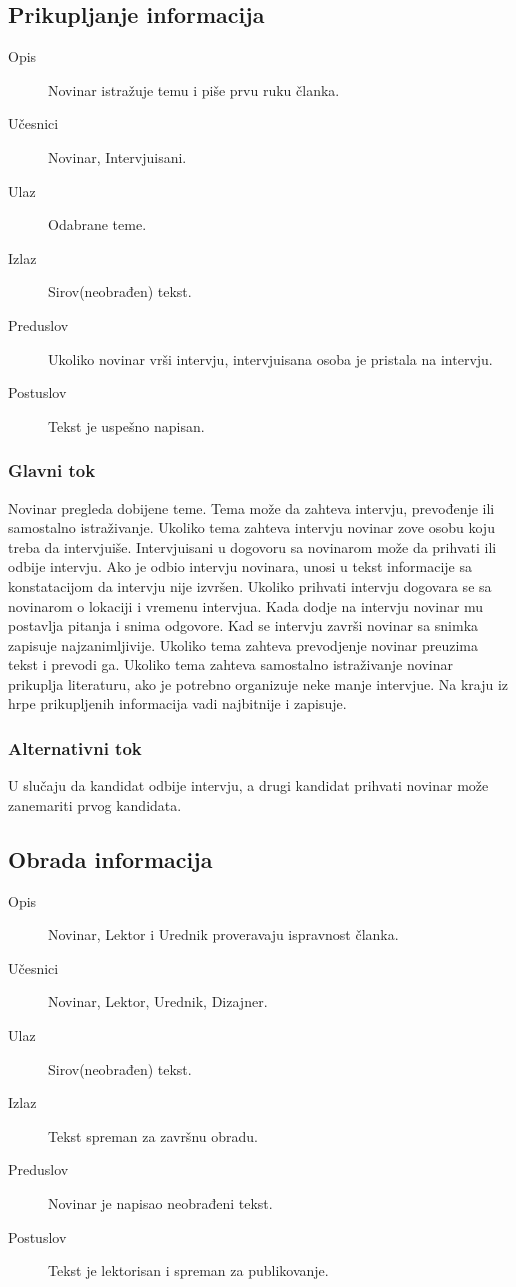 \subsection{Prikupljanje informacija}
\begin{description}
\item [Opis] Novinar istražuje temu i piše prvu ruku članka.
\item [Učesnici] Novinar, Intervjuisani.
\item [Ulaz] Odabrane teme.
\item [Izlaz] Sirov(neobrađen) tekst.
\item [Preduslov] Ukoliko novinar vrši intervju, intervjuisana osoba je pristala na intervju.
\item [Postuslov] Tekst je uspešno napisan.
\end{description}      
\subsubsection{Glavni tok}
Novinar pregleda dobijene teme. Tema može da zahteva intervju, prevođenje ili samostalno istraživanje. Ukoliko tema zahteva intervju novinar zove osobu koju treba da intervjuiše. Intervjuisani u dogovoru sa novinarom može da prihvati ili odbije intervju. Ako je odbio intervju novinara, unosi u tekst informacije sa konstatacijom da intervju nije izvršen. Ukoliko prihvati intervju dogovara se sa novinarom o lokaciji i vremenu intervjua. Kada dodje na intervju novinar mu postavlja pitanja i snima odgovore. Kad se intervju završi novinar sa snimka zapisuje najzanimljivije. Ukoliko tema zahteva prevodjenje novinar preuzima tekst i prevodi ga. Ukoliko tema zahteva samostalno istraživanje novinar prikuplja literaturu, ako je potrebno organizuje neke manje intervjue. Na kraju iz hrpe prikupljenih informacija vadi najbitnije i zapisuje. 
\subsubsection{Alternativni tok}
U slučaju da kandidat odbije intervju, a drugi kandidat prihvati novinar može zanemariti prvog kandidata. 


\subsection{Obrada informacija}
\begin{description}
\item [Opis] Novinar, Lektor i Urednik proveravaju ispravnost članka.
\item [Učesnici] Novinar, Lektor, Urednik, Dizajner.
\item [Ulaz] Sirov(neobrađen) tekst.
\item [Izlaz] Tekst spreman za završnu obradu.
\item [Preduslov] Novinar je napisao neobrađeni tekst.
\item [Postuslov] Tekst je lektorisan i spreman za publikovanje.
\end{description}      
